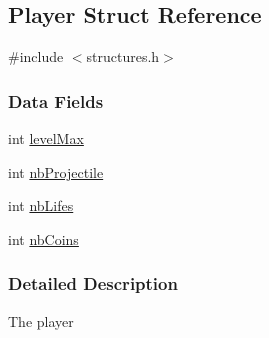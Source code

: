 \hypertarget{struct_player}{\subsection{Player Struct Reference}
\label{struct_player}
}


{\ttfamily \#include $<$structures.\-h$>$}

\subsubsection*{Data Fields}
\begin{DoxyCompactItemize}
\item 
int \hyperlink{struct_player_a239aaece8decb78587f72db6166743ca}{level\-Max}
\item 
int \hyperlink{struct_player_a803fd7edf0558a9e0dc73e6351ad85d0}{nb\-Projectile}
\item 
int \hyperlink{struct_player_ae4069fd5e08497b888237e5eb9f2e4ad}{nb\-Lifes}
\item 
int \hyperlink{struct_player_a90f72e24f08427f541b92bfc5a7982d3}{nb\-Coins}
\end{DoxyCompactItemize}


\subsubsection{Detailed Description}
The player 

